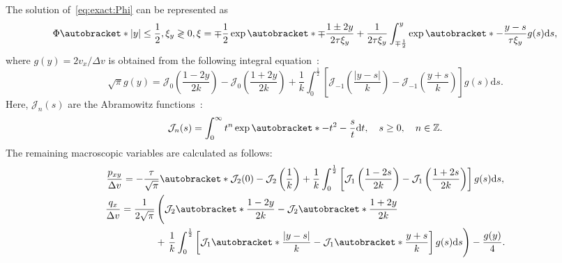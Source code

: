 \documentclass{elsarticle} %
\newcommand{\dd}{\mathrm{d}}
\DeclarePairedDelimiter\autobracket()       %
\newcommand{\br}[1]{\autobracket*{#1}}
\begin{document}
The solution of~\eqref{eq:exact:Phi} can be represented as
\begin{equation}\label{eq:exact:Phi_explicit}
    \Phi\br{ |y| \leq \frac12, \xi_y\gtrless0, \xi } = \mp\frac12\exp\br{ \mp\frac{1\pm2y}{2\tau\xi_y} } +
        \frac1{2\tau\xi_y} \int_{\mp\frac12}^y \exp\br{ -\frac{y-s}{\tau\xi_y} } g(s)\dd{s} ,
\end{equation}
where \(g(y) = 2v_x/\Delta v\) is obtained from the following integral equation~\cite{Willis1962}:
\begin{equation}\label{eq:exact:g}
    \sqrt{\pi} g(y) = \mathcal{J}_0 \left(\frac{1-2y}{2k}\right) - \mathcal{J}_0 \left(\frac{1+2y}{2k}\right)
        + \frac1k \int_0^{\frac12} \left[ \mathcal{J}_{-1}\left(\frac{|y-s|}{k}\right)
        - \mathcal{J}_{-1}\left(\frac{y+s}{k}\right) \right] g(s) \dd{s}.
\end{equation}
Here, \(\mathcal{J}_n(s)\) are the Abramowitz functions~\cite{Abramowitz1972}:
\begin{equation}\label{eq:exact:Abramowitz}
    \mathcal{J}_n(s) = \int_0^\infty t^n \exp\br{ -t^2-\frac{s}{t} } \dd t,
    \quad s\ge0, \quad n \in \mathbb{Z}.
\end{equation}
The remaining macroscopic variables are calculated as follows:
\begin{gather}
    \frac{p_{xy}}{\Delta v} = -\frac{\tau}{\sqrt{\pi}} \br{
        \mathcal{J}_2(0)-\mathcal{J}_2\left(\frac1k\right)
        + \frac1k\int_0^{\frac12}\left[
            \mathcal{J}_1\left(\frac{1-2s}{2k}\right)-\mathcal{J}_1\left(\frac{1+2s}{2k}\right)
        \right]g(s)\dd{s}
    }, \label{eq:exact:Pxy} \\
    \begin{aligned}
    \frac{q_x}{\Delta v} = \frac1{2\sqrt{\pi}} & \left(\vphantom{\int_0^{\frac12}}
        \mathcal{J}_2\br{ \frac{1-2y}{2k} } - \mathcal{J}_2\br{ \frac{1+2y}{2k} }\right. \\
        &+\left. \frac1k\int_0^{\frac12}\left[
            \mathcal{J}_1\br{ \frac{|y-s|}k } - \mathcal{J}_1\br{ \frac{y+s}k }
        \right]g(s)\dd{s}
    \right) - \frac{g(y)}4.
    \end{aligned} \label{eq:exact:qflow}
\end{gather}


\end{document}
